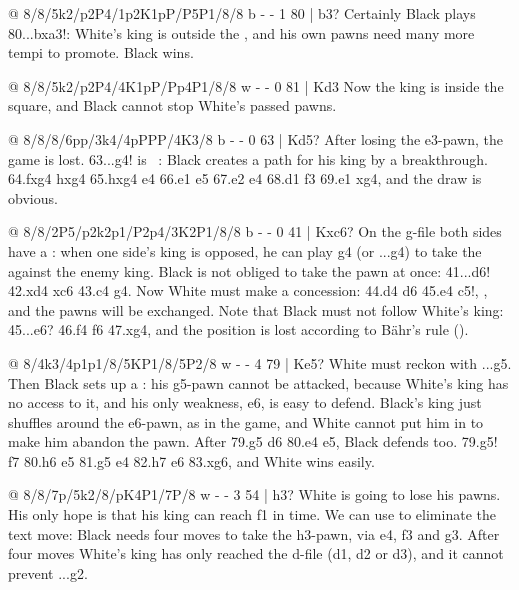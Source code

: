 @ 8/8/5k2/p2P4/1p2K1pP/P5P1/8/8 b - - 1 80 | b3?
Certainly Black plays 80...bxa3!: White's king is outside the
, and his own pawns
need many more tempi to promote. Black wins.

@ 8/8/5k2/p2P4/4K1pP/Pp4P1/8/8 w - - 0 81 | Kd3
Now the king is inside the square, and Black cannot stop White's passed pawns.

@ 8/8/8/6pp/3k4/4pPPP/4K3/8 b - - 0 63 | Kd5?
After losing the e3-pawn, the game is lost. 63...g4! is
~\cite{AnythingAboutChess:2014-beachhead}:
Black creates a path for his king by a breakthrough. 64.fxg4 hxg4 65.hxg4 \K e4 66.\K e1 \K e5
67.\K e2 \K e4 68.\K d1 \K f3 69.\K e1 \K xg4, and the draw is obvious.

@ 8/8/2P5/p2k2p1/P2p4/3K2P1/8/8 b - - 0 41 | Kxc6?
On the g-file both sides have a : when one side's king is opposed, he can play g4
(or ...g4) to take the  against the enemy
king. Black is not obliged to take the pawn at once: 41...\K d6! 42.\K xd4 \K xc6 43.\K c4 g4. Now
White must make a concession: 44.\K d4 \K d6 45.\K e4 \K c5!, ,
and the pawns will be exchanged. Note that Black must not follow White's king: 45...\K e6? 46.\K f4
\K f6 47.\K xg4, and the position is lost according to Bähr's rule
().

@ 8/4k3/4p1p1/8/5KP1/8/5P2/8 w - - 4 79 | Ke5?
White must reckon with ...g5. Then Black sets up a : his g5-pawn cannot
be attacked, because White's king has no access to it, and his only weakness, e6, is easy to defend.
Black's king just shuffles around the e6-pawn, as in the game, and White cannot put him in
 to make him abandon the pawn. After 79.g5 \K d6 80.\K e4 e5, Black
defends too. 79.\K g5! \K f7 80.\K h6 e5 81.g5 e4 82.\K h7 \K e6 83.\K xg6, and White wins easily.

@ 8/8/7p/5k2/8/pK4P1/7P/8 w - - 3 54 | h3?
White is going to lose his pawns. His only hope is that his king can reach f1 in time. We can use
 to eliminate the text move: Black needs four moves to
take the h3-pawn, via e4, f3 and g3. After four moves White's king has only reached the d-file (d1, d2
or d3), and it cannot prevent ...\K g2.

